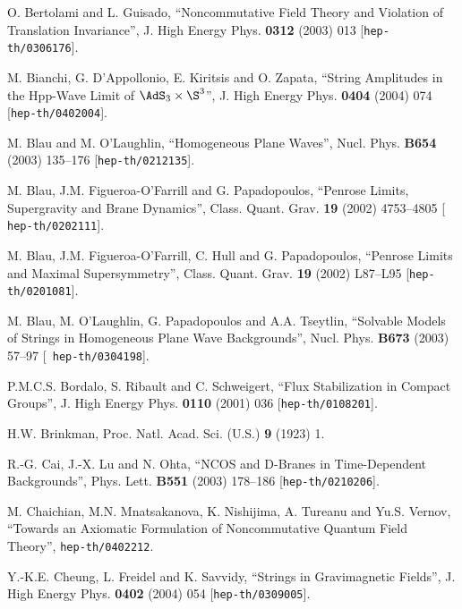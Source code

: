 \begin{thebibliography}{199}
 O. Bertolami and L. Guisado, ``Noncommutative Field
  Theory and Violation of Translation Invariance'', J. High Energy
  Phys. {\bf 0312} (2003) 013 [{\tt hep-th/0306176}].

 M. Bianchi, G. D'Appollonio, E. Kiritsis and
  O. Zapata, ``String Amplitudes in the Hpp-Wave Limit of
  $\AdS_3\times\S^3$'', J. High Energy Phys. {\bf 0404} (2004) 074
  [{\tt hep-th/0402004}].

 M. Blau and M. O'Laughlin, ``Homogeneous Plane Waves'',
  Nucl. Phys. {\bf B654} (2003) 135--176 [{\tt hep-th/0212135}].

 M. Blau, J.M. Figueroa-O'Farrill and G. Papadopoulos,
  ``Penrose Limits, Supergravity and Brane Dynamics'',
  Class. Quant. Grav. {\bf 19} (2002) 4753--4805 [{\tt
  hep-th/0202111}].

 M. Blau, J.M. Figueroa-O'Farrill, C. Hull and
  G. Papadopoulos, ``Penrose Limits and Maximal Supersymmetry'',
  Class. Quant. Grav. {\bf 19} (2002) L87--L95 [{\tt hep-th/0201081}].

 M. Blau, M. O'Laughlin, G. Papadopoulos and
  A.A. Tseytlin, ``Solvable Models of Strings in Homogeneous Plane
  Wave Backgrounds'', Nucl. Phys. {\bf B673} (2003) 57--97 [{\tt
    hep-th/0304198}].

 P.M.C.S. Bordalo, S. Ribault and C. Schweigert, ``Flux
  Stabilization in Compact Groups'', J. High Energy Phys. {\bf 0110}
  (2001) 036 [{\tt hep-th/0108201}].

 H.W. Brinkman, Proc. Natl. Acad. Sci. (U.S.) {\bf 9}
  (1923) 1.

 R.-G. Cai, J.-X. Lu and N. Ohta, ``NCOS and D-Branes in
  Time-Dependent Backgrounds'', Phys. Lett. {\bf B551} (2003) 178--186
  [{\tt hep-th/0210206}].

 M. Chaichian, M.N. Mnatsakanova, K. Nishijima,
  A. Tureanu and Yu.S. Vernov, ``Towards an Axiomatic Formulation of
  Noncommutative Quantum Field Theory'', {\tt hep-th/0402212}.

 Y.-K.E. Cheung, L. Freidel and K. Savvidy, ``Strings in
  Gravimagnetic Fields'', J. High Energy Phys. {\bf 0402} (2004) 054
  [{\tt hep-th/0309005}].


\end{thebibliography}
